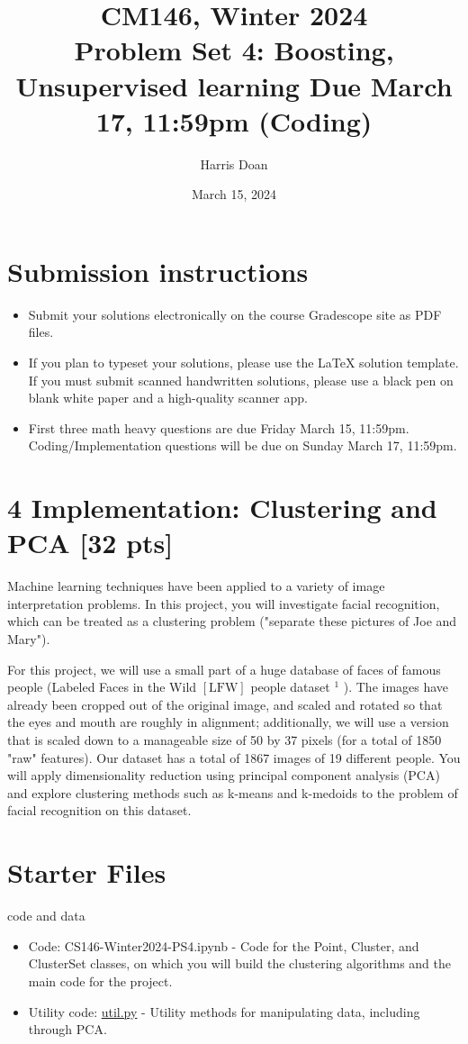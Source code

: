 \documentclass[10pt]{article}
\title{CM146, Winter 2024 \\
 Problem Set 4: Boosting, Unsupervised learning Due March 17, 11:59pm (Coding) }
\author{Harris Doan}
\date{March 15, 2024}
\begin{document}
\maketitle
\section*{Submission instructions}
\begin{itemize}
  \item Submit your solutions electronically on the course Gradescope site as PDF files.
  \item If you plan to typeset your solutions, please use the LaTeX solution template. If you must submit scanned handwritten solutions, please use a black pen on blank white paper and a high-quality scanner app.
  \item First three math heavy questions are due Friday March 15, 11:59pm. Coding/Implementation questions will be due on Sunday March 17, 11:59pm.
\end{itemize}

\section*{4 Implementation: Clustering and PCA [32 pts]}
Machine learning techniques have been applied to a variety of image interpretation problems. In this project, you will investigate facial recognition, which can be treated as a clustering problem ("separate these pictures of Joe and Mary").

For this project, we will use a small part of a huge database of faces of famous people (Labeled Faces in the Wild $[\mathrm{LFW}]$ people dataset ${ }^{1}$ ). The images have already been cropped out of the original image, and scaled and rotated so that the eyes and mouth are roughly in alignment; additionally, we will use a version that is scaled down to a manageable size of 50 by 37 pixels (for a total of 1850 "raw" features). Our dataset has a total of 1867 images of 19 different people. You will apply dimensionality reduction using principal component analysis (PCA) and explore clustering methods such as k-means and k-medoids to the problem of facial recognition on this dataset.

\section*{Starter Files}
code and data

\begin{itemize}
  \item Code: CS146-Winter2024-PS4.ipynb - Code for the Point, Cluster, and ClusterSet classes, on which you will build the clustering algorithms and the main code for the project.
  \item Utility code: \href{http://util.py}{util.py} - Utility methods for manipulating data, including through PCA.
\end{itemize}
\end{document}

